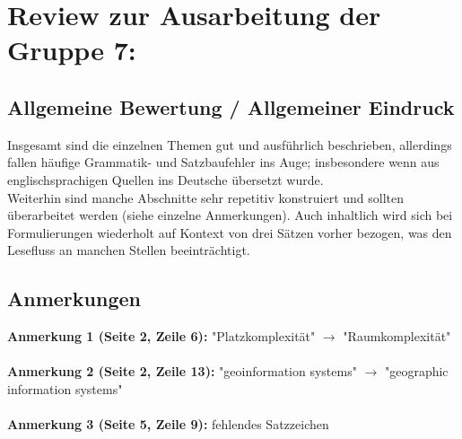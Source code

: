 \documentclass[a4paper,12pt]{book}
\begin{document}
\chapter*{Review zur Ausarbeitung der Gruppe 7:}

\section*{Allgemeine Bewertung / Allgemeiner Eindruck}
Insgesamt sind die einzelnen Themen gut und ausführlich beschrieben, allerdings fallen häufige Grammatik- und Satzbaufehler ins Auge; insbesondere wenn aus englischsprachigen Quellen ins Deutsche übersetzt wurde.\\
Weiterhin sind manche Abschnitte sehr repetitiv konstruiert und sollten überarbeitet werden (siehe einzelne Anmerkungen).
Auch inhaltlich wird sich bei Formulierungen wiederholt auf Kontext von drei Sätzen vorher bezogen, was den Lesefluss an manchen Stellen beeinträchtigt.

\section*{Anmerkungen}

\textbf{Anmerkung 1 (Seite 2, Zeile 6):}
"Platzkomplexität" $\rightarrow$ "Raumkomplexität"\\
\\

\noindent
\textbf{Anmerkung 2 (Seite 2, Zeile 13):}
"geoinformation systems" $\rightarrow$ "geographic information systems"\\
\\

\noindent
\textbf{Anmerkung 3 (Seite 5, Zeile 9):}
fehlendes Satzzeichen\\
\\
\end{document}
